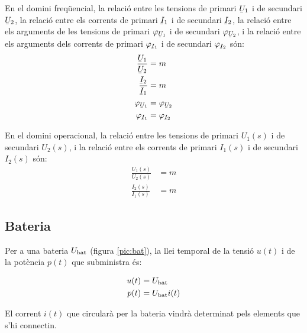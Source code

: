  En el domini
freqüencial, la relació entre les tensions de primari $\cmplx{U}_1$
i de secundari $\cmplx{U}_2$, la relació entre els corrents de
primari $\cmplx{I}_1$ i de secundari $\cmplx{I}_2$, la relació entre
els arguments de les tensions de primari $\varphi_{\cmplx{U}_1}$ i
de secundari $\varphi_{\cmplx{U}_2}$, i  la relació entre els
arguments dels corrents de primari $\varphi_{\cmplx{I}_1}$ i de
secundari $\varphi_{\cmplx{I}_2}$ són:
\begin{align}
	\frac{\cmplx{U}_1}{\cmplx{U}_2} &= m  \\
	\frac{\cmplx{I}_2}{\cmplx{I}_1} &= m \\
	\varphi_{\cmplx{U}_1} &= \varphi_{\cmplx{U}_2} \\
	\varphi_{\cmplx{I}_1} &= \varphi_{\cmplx{I}_2}
\end{align}

 En el domini operacional, la relació entre les tensions de primari $U_1(s)$ i de secundari $U_2(s)$,  i la relació entre els corrents de primari $I_1(s)$ i de secundari $I_2(s)$ són:
\begin{align}
	\frac{U_1(s)}{U_2(s)} &= m  \\
	\frac{I_2(s)}{I_1(s)} &= m
\end{align}

\subsection{Bateria} 

Per a una bateria $U_\mathrm{bat}$ (figura
\vref{pic:bat}), la llei temporal de la tensió $u(t)$ i de la
potència $p(t)$ que subministra és:

\hfill
\begin{minipage}[b]{5cm}
	
	\label{pic:bat}
\end{minipage}
\hfill
\begin{minipage}[b][3cm][t]{8cm}
	\begin{align}
		u(t) &= U_\mathrm{bat} \\  p(t) &= U_\mathrm{bat} i(t)
	\end{align}
\end{minipage}


El corrent $i(t)$ que circularà per la bateria vindrà determinat
pels elements que s'hi connectin.

